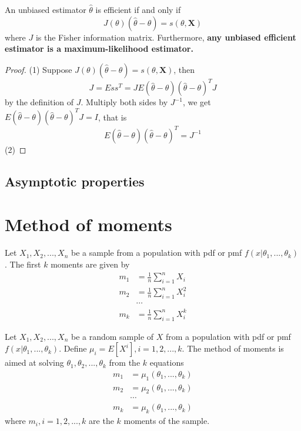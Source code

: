\begin{refsection}
\begin{theorem}\cite[552]{moon2000mathematical}
	An unbiased estimator $\hat{\theta}$ is efficient if and only if 
	$$J(\theta)(\hat{\theta}-\theta) = s(\theta,\bm{X})$$
	where $J$ is the Fisher information matrix.
	Furthermore, \textbf{any unbiased efficient estimator is a maximum-likelihood estimator.}
\end{theorem}
\begin{proof}
(1) Suppose $J(\theta)(\hat{\theta}-\theta) = s(\theta,\bm{X})$, then $$J = Ess^T = JE(\hat{\theta}-\theta)(\hat{\theta}-\theta)^T J$$
by the definition of $J$. Multiply both sides by $J^{-1}$, we get $E(\hat{\theta}-\theta)(\hat{\theta}-\theta)^T J = I$, that is
$$E(\hat{\theta}-\theta)(\hat{\theta}-\theta)^T = J^{-1}$$
(2)

\end{proof}


\subsection{Asymptotic properties}




\section{Method of moments}

\begin{definition}\cite[312]{casella2002statistical} Let $X_1,X_2,...,X_n$ be a sample from a population with pdf or pmf $f(x|\theta_1,...,\theta_k)$. The first $k$ moments are given by
\begin{align*}
m_1 &= \frac{1}{n}\sum_{i=1}^n X_i \\
m_2 &= \frac{1}{n}\sum_{i=1}^n X_i^2 \\
&\cdots \\
m_k &= \frac{1}{n}\sum_{i=1}^n X_i^k 
\end{align*}	
\end{definition}


\begin{definition}\cite[312]{casella2002statistical} Let $X_1,X_2,...,X_n$ be a random sample of $X$ from a population with pdf or pmf $f(x|\theta_1,...,\theta_k)$. Define $\mu_i = E[X^i],i=1,2,...,k$. The method of moments is aimed at solving $\theta_1,\theta_2,...,\theta_k$ from the $k$ equations
	\begin{align*}
	m_1 &= \mu_1(\theta_1,...,\theta_k) \\
	m_2 &= \mu_2(\theta_1,...,\theta_k) \\
	&\cdots \\
	m_k &= \mu_k(\theta_1,...,\theta_k) 
	\end{align*}
where $m_i,i=1,2,...,k$ are the $k$ moments of the sample.			
\end{definition}



\end{refsection}
